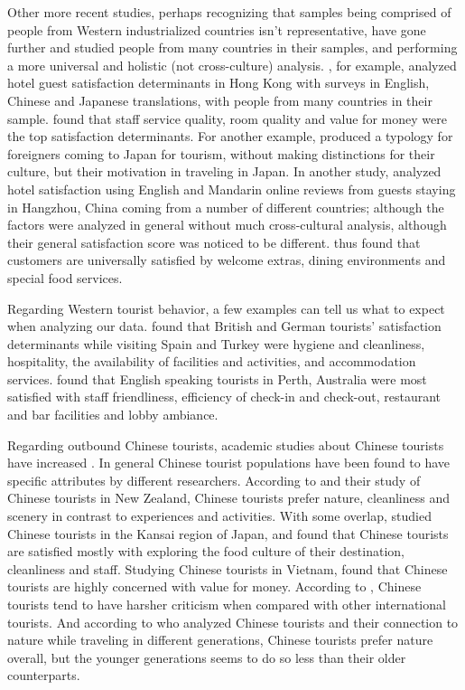 \documentclass[review]{elsarticle}
\begin{document}
Other more recent studies, perhaps recognizing that samples being comprised of people from Western industrialized countries isn't representative, have gone further and studied people from many countries in their samples, and performing a more universal and holistic (not cross-culture) analysis. \cite{choi2001}, for example, analyzed hotel guest satisfaction determinants in Hong Kong with surveys in English, Chinese and Japanese translations, with people from many countries in their sample. \cite{choi2001} found that staff service quality, room quality and value for money were the top satisfaction determinants. For another example, \cite{Uzama2012} produced a typology for foreigners coming to Japan for tourism, without making distinctions for their culture, but their motivation in traveling in Japan. In another study, \cite{zhou2014} analyzed hotel satisfaction using English and Mandarin online reviews from guests staying in Hangzhou, China coming from a number of different countries; although the factors were analyzed in general without much cross-cultural analysis, although their general satisfaction score was noticed to be different. \cite{zhou2014} thus found that customers are universally satisfied by welcome extras, dining environments and special food services. 

Regarding Western tourist behavior, a few examples can tell us what to expect when analyzing our data. \cite{kozak2002} found that British and German tourists' satisfaction determinants while visiting Spain and Turkey were hygiene and cleanliness, hospitality, the availability of facilities and activities, and accommodation services. \cite{shanka2004} found that English speaking tourists in Perth, Australia were most satisfied with staff friendliness, efficiency of check-in and check-out, restaurant and bar facilities and lobby ambiance. 

Regarding outbound Chinese tourists, academic studies about Chinese tourists have increased \cite[][]{sun2017}. In general Chinese tourist populations have been found to have specific attributes by different researchers. According to \cite{ryan2001} and their study of Chinese tourists in New Zealand, Chinese tourists prefer nature, cleanliness and scenery in contrast to experiences and activities. With some overlap, \cite{dongyang2015} studied Chinese tourists in the Kansai region of Japan, and found that Chinese tourists are satisfied mostly with exploring the food culture of their destination, cleanliness and staff. Studying Chinese tourists in Vietnam, \cite{truong2009} found that Chinese tourists are highly concerned with value for money. According to \cite{liu2019}, Chinese tourists tend to have harsher criticism when compared with other international tourists. And according to \cite{gao2017chinese} who analyzed Chinese tourists and their connection to nature while traveling in different generations, Chinese tourists prefer nature overall, but the younger generations seems to do so less than their older counterparts. 
\end{document}
